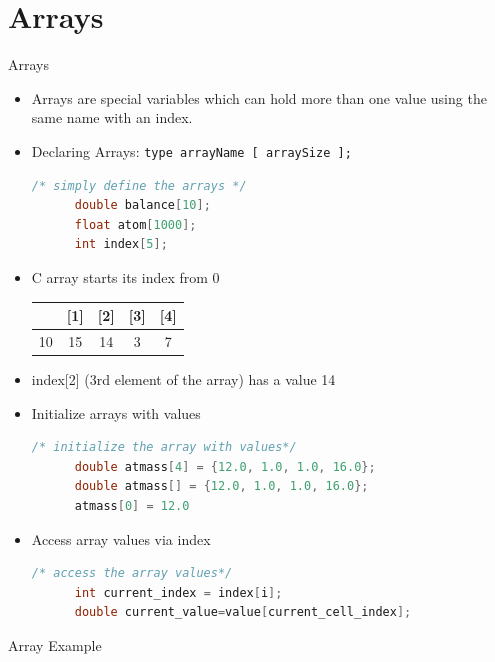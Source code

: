 \documentclass[10pt,t]{beamer}
\begin{document}
\section{Arrays}
\begin{frame}[fragile]{Arrays}
  \begin{itemize}
  \item Arrays are special variables which can hold more than one value using the same name with an index.
  \item Declaring Arrays: \lstinline[basicstyle=\scriptsize\ttfamily]|type arrayName [ arraySize ];|
    \begin{lstlisting}[language=C,basicstyle=\scriptsize\ttfamily]
      /* simply define the arrays */
      double balance[10];
      float atom[1000];
      int index[5];
    \end{lstlisting}
  \item C array starts its index from 0

    \begin{tabular}{|c|c|c|c|c|}
      \hline
      [0] & [1] & [2] & [3] & [4] \\
      \hline
      10 & 15 & 14 & 3 & 7 \\
      \hline
    \end{tabular}
  \item[] index[2] (3rd element of the array) has a value 14
  \item Initialize arrays with values
    \begin{lstlisting}[language=C,basicstyle=\scriptsize\ttfamily]
      /* initialize the array with values*/
      double atmass[4] = {12.0, 1.0, 1.0, 16.0};
      double atmass[] = {12.0, 1.0, 1.0, 16.0};
      atmass[0] = 12.0
    \end{lstlisting}
  \item Access array values via index
    \begin{lstlisting}[language=C,basicstyle=\scriptsize\ttfamily]
      /* access the array values*/
      int current_index = index[i];
      double current_value=value[current_cell_index];
    \end{lstlisting}
  \end{itemize}
\end{frame}

\begin{frame}[fragile]{Array Example}
  
\end{frame}
\end{document}
